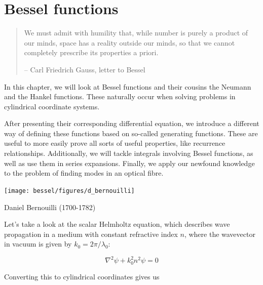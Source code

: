 \chapter{Bessel functions}
\label{h:bessel}

\begin{quote}
\noindent{}We must admit with humility that, while number is purely a product of our minds, space has a reality outside our minds, so that we cannot completely prescribe its properties a priori.

-- Carl Friedrich Gauss, letter to Bessel
\end{quote}

\chaptertoc

In this chapter, we will look at Bessel functions and their cousins the Neumann and the Hankel functions. These naturally occur when solving problems in cylindrical coordinate systems. 

After presenting their corresponding differential equation, we introduce a different way of defining these functions based on so-called generating functions. These are useful to more easily prove all sorts of useful properties, like recurrence relationships. Additionally, we will tackle integrals involving Bessel functions, as well as use them in series expansions. Finally, we apply our newfound knowledge to the problem of finding modes in an optical fibre.


\pagebreak


\label{sec-bessel-eq}

\begin{marginfigure}[.3cm]
  \texttt{[image: bessel/figures/d\_bernouilli]}
  \caption{Daniel Bernouilli (1700-1782)}
\end{marginfigure}

Let's take a look at the scalar Helmholtz equation, which describes wave propagation in a medium with constant refractive index $n$, where the wavevector in vacuum is given by $k_0=2 \pi / \lambda_0$:

\begin{equation}
\nabla^2 \psi  + k_0^2 n^2 \psi = 0 
\end{equation}

Converting this to cylindrical coordinates gives us

